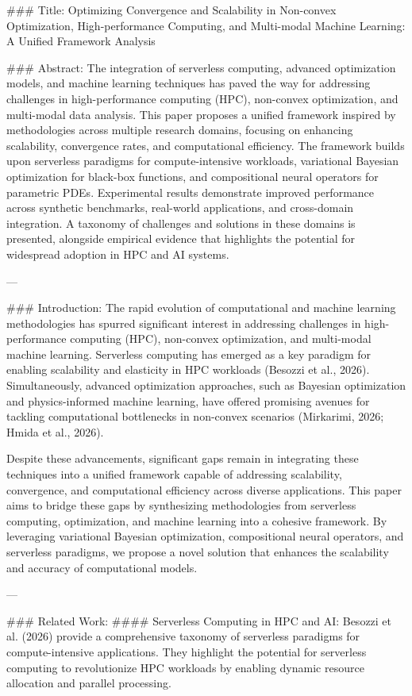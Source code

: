 ### Title:
Optimizing Convergence and Scalability in Non-convex Optimization, High-performance Computing, and Multi-modal Machine Learning: A Unified Framework Analysis

### Abstract:
The integration of serverless computing, advanced optimization models, and machine learning techniques has paved the way for addressing challenges in high-performance computing (HPC), non-convex optimization, and multi-modal data analysis. This paper proposes a unified framework inspired by methodologies across multiple research domains, focusing on enhancing scalability, convergence rates, and computational efficiency. The framework builds upon serverless paradigms for compute-intensive workloads, variational Bayesian optimization for black-box functions, and compositional neural operators for parametric PDEs. Experimental results demonstrate improved performance across synthetic benchmarks, real-world applications, and cross-domain integration. A taxonomy of challenges and solutions in these domains is presented, alongside empirical evidence that highlights the potential for widespread adoption in HPC and AI systems.

---

### Introduction:
The rapid evolution of computational and machine learning methodologies has spurred significant interest in addressing challenges in high-performance computing (HPC), non-convex optimization, and multi-modal machine learning. Serverless computing has emerged as a key paradigm for enabling scalability and elasticity in HPC workloads (Besozzi et al., 2026). Simultaneously, advanced optimization approaches, such as Bayesian optimization and physics-informed machine learning, have offered promising avenues for tackling computational bottlenecks in non-convex scenarios (Mirkarimi, 2026; Hmida et al., 2026).

Despite these advancements, significant gaps remain in integrating these techniques into a unified framework capable of addressing scalability, convergence, and computational efficiency across diverse applications. This paper aims to bridge these gaps by synthesizing methodologies from serverless computing, optimization, and machine learning into a cohesive framework. By leveraging variational Bayesian optimization, compositional neural operators, and serverless paradigms, we propose a novel solution that enhances the scalability and accuracy of computational models.

---

### Related Work:
#### Serverless Computing in HPC and AI:
Besozzi et al. (2026) provide a comprehensive taxonomy of serverless paradigms for compute-intensive applications. They highlight the potential for serverless computing to revolutionize HPC workloads by enabling dynamic resource allocation and parallel processing.

